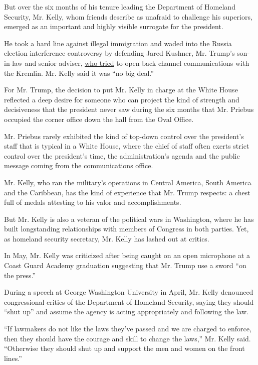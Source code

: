 But over the six months of his tenure leading the Department of Homeland
Security, Mr. Kelly, whom friends describe as unafraid to challenge his
superiors, emerged as an important and highly visible surrogate for the
president.

He took a hard line against illegal immigration and waded into the
Russia election interference controversy by defending Jared Kushner, Mr.
Trump's son-in-law and senior adviser,
\href{https://www.nytimes3xbfgragh.onion/2017/05/26/us/politics/kushner-talked-to-russian-envoy-about-creating-secret-channel-with-kremlin.html}{who
tried} to open back channel communications with the Kremlin. Mr. Kelly
said it was ``no big deal.''

For Mr. Trump, the decision to put Mr. Kelly in charge at the White
House reflected a deep desire for someone who can project the kind of
strength and decisiveness that the president never saw during the six
months that Mr. Priebus occupied the corner office down the hall from
the Oval Office.

Mr. Priebus rarely exhibited the kind of top-down control over the
president's staff that is typical in a White House, where the chief of
staff often exerts strict control over the president's time, the
administration's agenda and the public message coming from the
communications office.

Mr. Kelly, who ran the military's operations in Central America, South
America and the Caribbean, has the kind of experience that Mr. Trump
respects: a chest full of medals attesting to his valor and
accomplishments.

But Mr. Kelly is also a veteran of the political wars in Washington,
where he has built longstanding relationships with members of Congress
in both parties. Yet, as homeland security secretary, Mr. Kelly has
lashed out at critics.

In May, Mr. Kelly was criticized after being caught on an open
microphone at a Coast Guard Academy graduation suggesting that Mr. Trump
use a sword ``on the press.''

During a speech at George Washington University in April, Mr. Kelly
denounced congressional critics of the Department of Homeland Security,
saying they should ``shut up'' and assume the agency is acting
appropriately and following the law.

``If lawmakers do not like the laws they've passed and we are charged to
enforce, then they should have the courage and skill to change the
laws,'' Mr. Kelly said. ``Otherwise they should shut up and support the
men and women on the front lines.''

